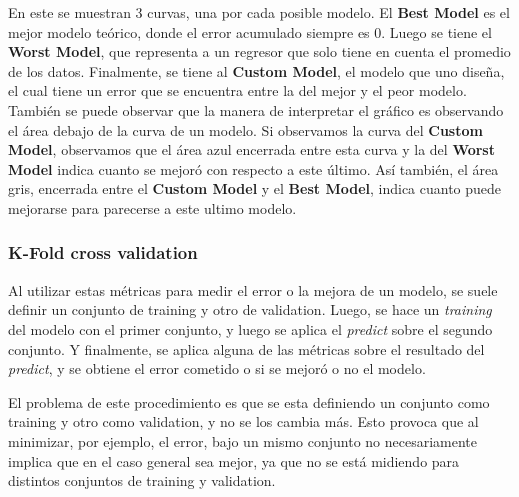         En este se muestran 3 curvas, una por cada posible modelo.
        El \textbf{Best Model} es el mejor modelo teórico, donde el error acumulado siempre es 0. Luego se tiene el \textbf{Worst Model}, que representa a un regresor que solo tiene en cuenta el promedio de los datos.
        Finalmente, se tiene al \textbf{Custom Model}, el modelo que uno diseña, el cual tiene un error que se encuentra entre la del mejor y el peor modelo. También se puede observar que la manera de interpretar el gráfico es observando el área debajo de la curva de un modelo.
        Si observamos la curva del \textbf{Custom Model}, observamos que el área azul encerrada entre esta curva y la del \textbf{Worst Model} indica cuanto se mejoró con respecto a este último. Así también, el área gris, encerrada entre el \textbf{Custom Model} y el \textbf{Best Model}, indica cuanto puede mejorarse para parecerse a este ultimo modelo.
        
\subsubsection{K-Fold cross validation}

    
    Al utilizar estas métricas para medir el error o la mejora de un modelo, se suele definir un conjunto de training y otro de validation. Luego, se hace un \textit{training} del modelo con el primer conjunto, y luego se aplica el \textit{predict} sobre el segundo conjunto. Y finalmente, se aplica alguna de las métricas sobre el resultado del \textit{predict}, y se obtiene el error cometido o si se mejoró o no el modelo.
    
    El problema de este procedimiento es que se esta definiendo un conjunto como training y otro como validation, y no se los cambia más. Esto provoca que al minimizar, por ejemplo, el error, bajo un mismo conjunto no necesariamente implica que en el caso general sea mejor, ya que no se está midiendo para distintos conjuntos de training y validation.
    
